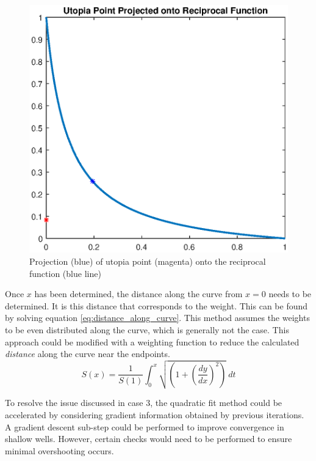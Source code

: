 \begin{figure}[ht]
    \centering
    \includegraphics[width=0.5\linewidth]{figures/chapter_6/ProjectionIdea.eps}
    \caption{Projection (blue) of utopia point (magenta) onto the reciprocal function (blue line)}
\end{figure}

Once $x$ has been determined, the distance along the curve from $x=0$ needs to be determined. It is this distance that corresponds to the weight. This can be found by solving equation \ref{eq:distance_along_curve}. This method assumes the weights to be even distributed along the curve, which is generally not the case. This approach could be modified with a weighting function to reduce the calculated \emph{distance} along the curve near the endpoints.
\begin{equation}
    S(x) = \frac{1}{S(1)} \int_0^x \sqrt{(1 + \left(\frac{dy}{dx}\right)^2)} \ dt 
    \label{eq:distance_along_curve}
\end{equation}

To resolve the issue discussed in case 3, the quadratic fit method could be accelerated by considering gradient information obtained by previous iterations. A gradient descent sub-step could be performed to improve convergence in shallow wells. However, certain checks would need to be performed to ensure minimal overshooting occurs.